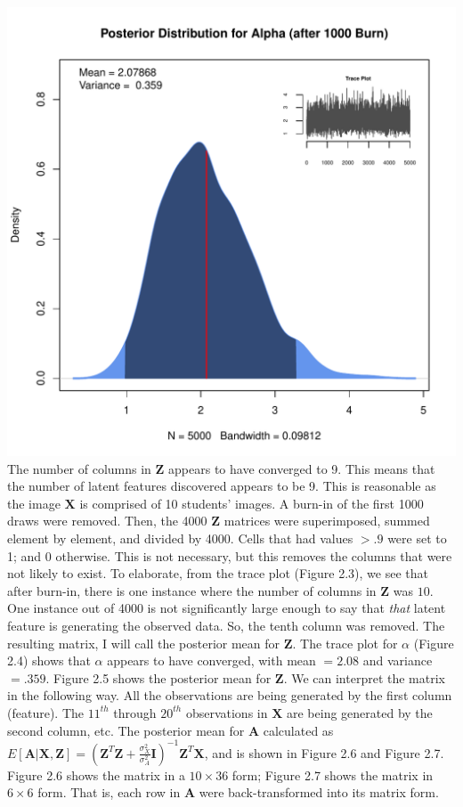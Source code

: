   \includegraphics{images/postAlpha.pdf}
\endmyfig
\noindent
The number of columns in $\bm Z$ appears to have converged to 9. This means
that the number of latent features discovered appears to be 9. This is
reasonable as the image $\bm X$ is comprised of 10 students' images. A burn-in
of the first 1000 draws were removed. Then, the 4000 $\bm Z$ matrices were
superimposed, summed element by element, and divided by 4000. Cells that had
values $> .9$ were set to 1; and 0 otherwise. This is not necessary, but this
removes the columns that were not likely to exist. To elaborate, from the trace
plot (Figure 2.3), we see that after burn-in, there is one instance where the
number of columns in $\bm Z$ was $10$.  One instance out of 4000 is not
significantly large enough to say that \textit{that} latent feature is 
generating the observed data. So, the tenth column was removed. The resulting
matrix, I will call the posterior mean for $\bm Z$.  The trace plot for
$\alpha$ (Figure 2.4) shows that $\alpha$ appears to have converged, with mean
$=2.08$ and variance $=.359$.  Figure 2.5 shows the posterior mean for $\bm Z$.
We can interpret the matrix in the following way. All the observations are 
being generated by the first column (feature). The $11^{th}$ through $20^{th}$
observations in $\bm X$ are being generated by the second column, etc.
The posterior mean for $\bm A$ calculated as $E[\bm{A|X,Z}] = (\bm Z^T\bm Z +
\frac{\sigma_X^2}{\sigma_A^2} \textbf{I})^{-1}\bm Z^T \bm X$, and is shown
in Figure 2.6 and Figure 2.7. Figure 2.6 shows the matrix in a $10 \times 36$ form;
Figure 2.7 shows the matrix in $6 \times 6$ form. That is, each row in $\bm A$
were back-transformed into its matrix form.\\

